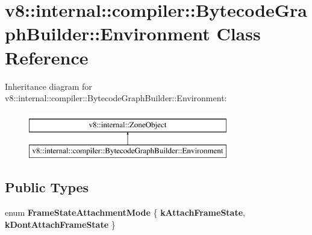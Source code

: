 \hypertarget{classv8_1_1internal_1_1compiler_1_1BytecodeGraphBuilder_1_1Environment}{}\section{v8\+:\+:internal\+:\+:compiler\+:\+:Bytecode\+Graph\+Builder\+:\+:Environment Class Reference}
\label{classv8_1_1internal_1_1compiler_1_1BytecodeGraphBuilder_1_1Environment}
Inheritance diagram for v8\+:\+:internal\+:\+:compiler\+:\+:Bytecode\+Graph\+Builder\+:\+:Environment\+:\begin{figure}[H]
\begin{center}
\leavevmode
\includegraphics[height=2.000000cm]{classv8_1_1internal_1_1compiler_1_1BytecodeGraphBuilder_1_1Environment}
\end{center}
\end{figure}
\subsection*{Public Types}
\begin{DoxyCompactItemize}
\item 
\mbox{\label{classv8_1_1internal_1_1compiler_1_1BytecodeGraphBuilder_1_1Environment_acf2feb946e8b7e5d7e3c661f81fdf36b}} 
enum {\bfseries Frame\+State\+Attachment\+Mode} \{ {\bfseries k\+Attach\+Frame\+State}, 
{\bfseries k\+Dont\+Attach\+Frame\+State}
 \}
\end{DoxyCompactItemize}
